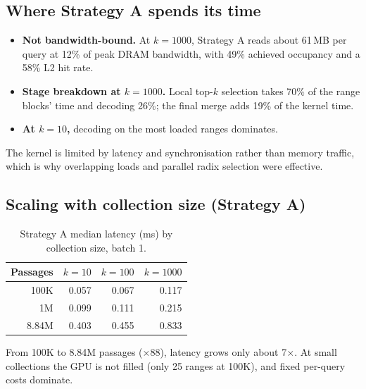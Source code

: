 \documentclass[11pt]{article}
\begin{document}
\subsection{Where Strategy A spends its time}
\begin{itemize}
\item \textbf{Not bandwidth-bound.} At $k=1000$, Strategy A reads about 61\,MB per query at 12\% of peak
  DRAM bandwidth, with 49\% achieved occupancy and a 58\% L2 hit rate.
\item \textbf{Stage breakdown at $k=1000$.} Local top-$k$ selection takes 70\% of the range blocks'
  time and decoding 26\%; the final merge adds 19\% of the kernel time.
\item \textbf{At $k=10$,} decoding on the most loaded ranges dominates.
\end{itemize}
The kernel is limited by latency and synchronisation rather than memory traffic, which is why
overlapping loads and parallel radix selection were effective.

\subsection{Scaling with collection size (Strategy A)}
\begin{table}[H]
\centering
\caption{Strategy A median latency (ms) by collection size, batch 1.}
\begin{tabular}{rrrr}
\toprule
Passages & $k=10$ & $k=100$ & $k=1000$\\
\midrule
100K & 0.057 & 0.067 & 0.117\\
1M & 0.099 & 0.111 & 0.215\\
8.84M & 0.403 & 0.455 & 0.833\\
\bottomrule
\end{tabular}
\end{table}
From 100K to 8.84M passages ($\times88$), latency grows only about 7$\times$. At small collections the
GPU is not filled (only 25 ranges at 100K), and fixed per-query costs dominate.
\end{document}
